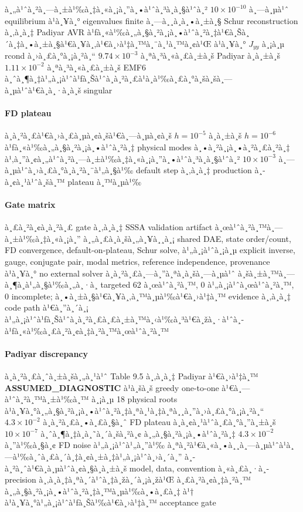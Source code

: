 ﻿\documentclass[12pt,a4paper]{article}
\newcommand{\sci}[2]{\ensuremath{#1\times10^{#2}}}
\newcommand{\source}[1]{\textbf{#1}}
\begin{document}
à¸„à¹ˆà¸²à¸—à¸±à¹‰à¸‡à¸«à¸¡à¸”à¸•à¹ˆà¸³à¸à¸§à¹ˆà¸² $\sci{10}{-10}$ à¸—à¸µà¹ˆ equilibrium à¹à¸¥à¸° eigenvalues finite
à¸—à¸¸à¸à¸•à¸±à¸§ Schur reconstruction à¸‚à¸­à¸‡ Padiyar AVR à¹ƒà¸«à¹‰à¸„à¸§à¸²à¸¡à¸•à¹ˆà¸²à¸‡à¹€à¸Šà¸´à¸‡à¸•à¸±à¸§à¹€à¸¥à¸‚à¹€à¸›à¹‡à¸™à¸¨à¸¹à¸™à¸¢à¹Œ
à¹à¸¥à¸° $J_{yy}$ à¸¡à¸µ rcond à¸›à¸£à¸°à¸¡à¸²à¸“ $\sci{9.74}{-3}$ à¸ªà¸³à¸«à¸£à¸±à¸š Padiyar à¸à¸±à¸š
$\sci{1.11}{-2}$ à¸ªà¸³à¸«à¸£à¸±à¸š EMF6 à¸ˆà¸¶à¸‡à¹„à¸¡à¹ˆà¹ƒà¸Šà¹ˆà¸à¸²à¸£à¹à¸à¹‰à¸£à¸°à¸šà¸šà¸—à¸µà¹ˆà¹€à¸à¸·à¸­à¸š singular

\paragraph{FD plateau}
à¸à¸²à¸£à¹€à¸›à¸£à¸µà¸¢à¸šà¹€à¸—à¸µà¸¢à¸š $h=10^{-5}$ à¸à¸±à¸š $h=10^{-6}$ à¹ƒà¸«à¹‰à¸„à¸§à¸²à¸¡à¸•à¹ˆà¸²à¸‡ physical modes
à¸•à¸²à¸¡à¸•à¸²à¸£à¸²à¸‡ à¹‚à¸”à¸¢à¸„à¹ˆà¸²à¸—à¸±à¹‰à¸‡à¸«à¸¡à¸”à¸•à¹ˆà¸³à¸à¸§à¹ˆà¸² $\sci{10}{-3}$ à¸—à¸µà¹ˆà¸›à¸£à¸°à¸à¸²à¸¨à¹„à¸§à¹‰ default step
à¸‚à¸­à¸‡ production à¸­à¸¢à¸¹à¹ˆà¸šà¸™ plateau à¸™à¸µà¹‰

\paragraph{Gate matrix}
à¸£à¸²à¸¢à¸à¸²à¸£ gate à¸‚à¸­à¸‡ SSSA validation artifact à¸œà¹ˆà¸²à¸™à¸—à¸±à¹‰à¸‡à¸«à¸¡à¸” à¸„à¸£à¸­à¸šà¸„à¸¥à¸¸à¸¡ shared DAE,
state order/count, FD convergence, default-on-plateau, Schur solve,
à¹„à¸¡à¹ˆà¸¡à¸µ explicit inverse, gauge, conjugate pair, modal metrics,
reference independence, provenance à¹à¸¥à¸° no external solver à¸à¸²à¸£à¸—à¸”à¸ªà¸­à¸šà¸—à¸µà¹ˆ
à¸šà¸±à¸™à¸—à¸¶à¸à¹„à¸§à¹‰à¸„à¸·à¸­ targeted 62 à¸œà¹ˆà¸²à¸™, 0 à¹„à¸¡à¹ˆà¸œà¹ˆà¸²à¸™, 0 incomplete; à¸•à¸±à¸§à¹€à¸¥à¸‚à¸™à¸µà¹‰à¹€à¸›à¹‡à¸™
evidence à¸‚à¸­à¸‡ code path à¹€à¸”à¸´à¸¡ à¹„à¸¡à¹ˆà¹ƒà¸Šà¹ˆà¸à¸²à¸£à¸£à¸±à¸™à¸‹à¹‰à¸³à¹€à¸žà¸·à¹ˆà¸­à¹ƒà¸«à¹‰à¸£à¸²à¸¢à¸‡à¸²à¸™à¸œà¹ˆà¸²à¸™

\paragraph{Padiyar discrepancy}
à¸à¸²à¸£à¸ˆà¸±à¸šà¸„à¸¹à¹ˆ Table 9.5 à¸‚à¸­à¸‡ Padiyar à¹€à¸›à¹‡à¸™ \source{ASSUMED\_DIAGNOSTIC} à¹à¸šà¸š
greedy one-to-one à¹€à¸—à¹ˆà¸²à¸™à¸±à¹‰à¸™ à¸¡à¸µ 18 physical roots à¹à¸¥à¸°à¸„à¸§à¸²à¸¡à¸•à¹ˆà¸²à¸‡à¸ªà¸¹à¸‡à¸ªà¸¸à¸”à¸›à¸£à¸°à¸¡à¸²à¸“
$\sci{4.3}{-2}$ à¸à¸²à¸£à¸•à¸£à¸§à¸ˆ FD plateau à¸­à¸¢à¸¹à¹ˆà¸£à¸°à¸”à¸±à¸š $\sci{10}{-7}$ à¸ˆà¸¶à¸‡à¸­à¸˜à¸´à¸šà¸²à¸¢
à¸„à¸§à¸²à¸¡à¸•à¹ˆà¸²à¸‡ $\sci{4.3}{-2}$ à¸”à¹‰à¸§à¸¢ FD noise à¹„à¸¡à¹ˆà¹„à¸”à¹‰ à¸ªà¸²à¹€à¸«à¸•à¸¸à¸—à¸µà¹ˆà¹à¸—à¹‰à¸ˆà¸£à¸´à¸‡à¸¢à¸±à¸‡à¹„à¸¡à¹ˆà¸›à¸´à¸”
à¸­à¸²à¸ˆà¹€à¸à¸µà¹ˆà¸¢à¸§à¸à¸±à¸š model, data, convention à¸«à¸£à¸·à¸­ precision à¸‚à¸­à¸‡à¸ªà¸´à¹ˆà¸‡à¸žà¸´à¸¡à¸žà¹Œ à¸£à¸²à¸¢à¸‡à¸²à¸™
à¸„à¸§à¸²à¸¡à¸•à¹ˆà¸²à¸‡à¸™à¸µà¹‰à¸•à¸£à¸‡ à¹† à¹à¸¥à¸°à¹„à¸¡à¹ˆà¹ƒà¸Šà¹‰à¹€à¸›à¹‡à¸™ acceptance gate
\end{document}
